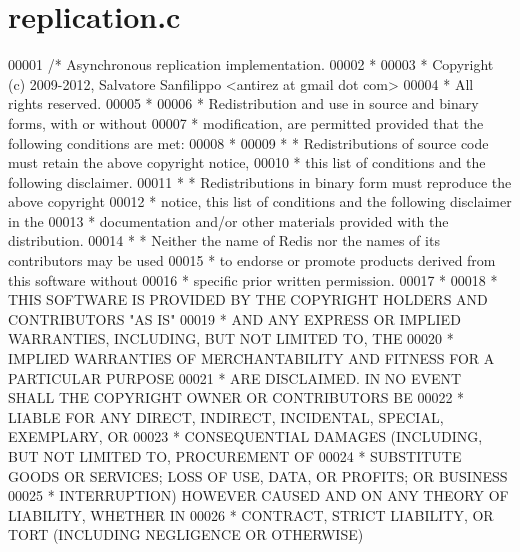\hypertarget{replication_8c_source}{}\section{replication.\+c}
\label{replication_8c_source}

\begin{DoxyCode}
00001 \textcolor{comment}{/* Asynchronous replication implementation.}
00002 \textcolor{comment}{ *}
00003 \textcolor{comment}{ * Copyright (c) 2009-2012, Salvatore Sanfilippo <antirez at gmail dot com>}
00004 \textcolor{comment}{ * All rights reserved.}
00005 \textcolor{comment}{ *}
00006 \textcolor{comment}{ * Redistribution and use in source and binary forms, with or without}
00007 \textcolor{comment}{ * modification, are permitted provided that the following conditions are met:}
00008 \textcolor{comment}{ *}
00009 \textcolor{comment}{ *   * Redistributions of source code must retain the above copyright notice,}
00010 \textcolor{comment}{ *     this list of conditions and the following disclaimer.}
00011 \textcolor{comment}{ *   * Redistributions in binary form must reproduce the above copyright}
00012 \textcolor{comment}{ *     notice, this list of conditions and the following disclaimer in the}
00013 \textcolor{comment}{ *     documentation and/or other materials provided with the distribution.}
00014 \textcolor{comment}{ *   * Neither the name of Redis nor the names of its contributors may be used}
00015 \textcolor{comment}{ *     to endorse or promote products derived from this software without}
00016 \textcolor{comment}{ *     specific prior written permission.}
00017 \textcolor{comment}{ *}
00018 \textcolor{comment}{ * THIS SOFTWARE IS PROVIDED BY THE COPYRIGHT HOLDERS AND CONTRIBUTORS "AS IS"}
00019 \textcolor{comment}{ * AND ANY EXPRESS OR IMPLIED WARRANTIES, INCLUDING, BUT NOT LIMITED TO, THE}
00020 \textcolor{comment}{ * IMPLIED WARRANTIES OF MERCHANTABILITY AND FITNESS FOR A PARTICULAR PURPOSE}
00021 \textcolor{comment}{ * ARE DISCLAIMED. IN NO EVENT SHALL THE COPYRIGHT OWNER OR CONTRIBUTORS BE}
00022 \textcolor{comment}{ * LIABLE FOR ANY DIRECT, INDIRECT, INCIDENTAL, SPECIAL, EXEMPLARY, OR}
00023 \textcolor{comment}{ * CONSEQUENTIAL DAMAGES (INCLUDING, BUT NOT LIMITED TO, PROCUREMENT OF}
00024 \textcolor{comment}{ * SUBSTITUTE GOODS OR SERVICES; LOSS OF USE, DATA, OR PROFITS; OR BUSINESS}
00025 \textcolor{comment}{ * INTERRUPTION) HOWEVER CAUSED AND ON ANY THEORY OF LIABILITY, WHETHER IN}
00026 \textcolor{comment}{ * CONTRACT, STRICT LIABILITY, OR TORT (INCLUDING NEGLIGENCE OR OTHERWISE)}

\end{DoxyCode}

